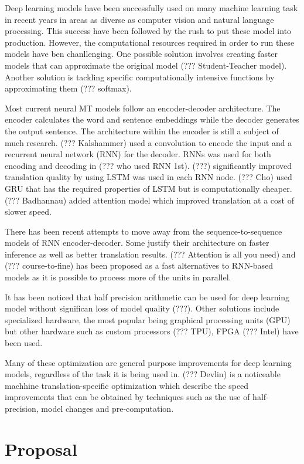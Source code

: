 \documentclass[]{article}
\begin{document}
Deep learning models have been successfully used on many machine learning task in recent years in areas as diverse as computer vision and natural language processing. This success have been followed by the rush to put these model into production. However, the computational resources required in order to run these models have ben chanllenging. One possible solution involves creating faster models that can approximate the original model (??? Student-Teacher model). Another solution is tackling specific computationally intensive functions by approximating them (??? softmax). 

Most current neural MT models follow an encoder-decoder architecture. The encoder calculates the word and sentence embeddings while the decoder generates the output sentence. The architecture within the encoder is still a subject of much research. (??? Kalshammer) used a convolution to encode the input and a recurrent neural network (RNN) for the decoder. RNNs was used for both encoding and decoding in (??? who used RNN 1st). (???) significantly improved translation quality by using LSTM was used in each RNN node. (??? Cho) used GRU that has the required properties of LSTM but is computationally cheaper. (??? Badhannau) added attention model which improved translation at a cost of slower speed.

There has been recent attempts to move away from the sequence-to-sequence models of RNN encoder-decoder. Some justify their architecture on faster inference as well as better translation results. (??? Attention is all you need) and (??? course-to-fine) has been proposed as a fast alternatives to RNN-based models as it is possible to process more of the units in parallel.

It has been noticed that half precision arithmetic can be used for deep learning model without significan loss of model quality (???). Other solutions include specialized hardware, the most popular being graphical processing units (GPU) but other hardware such as custom processors (??? TPU), FPGA (??? Intel) have been used. 

Many of these optimization are general purpose improvements for deep learning models, regardless of the task it is being used in. (??? Devlin) is a noticeable machhine translation-specific optimization which describe the speed improvements that can be obtained by techniques such as the use of half-precision, model changes and pre-computation.

\section{Proposal}
\label{sec:Proposal}
\end{document}
